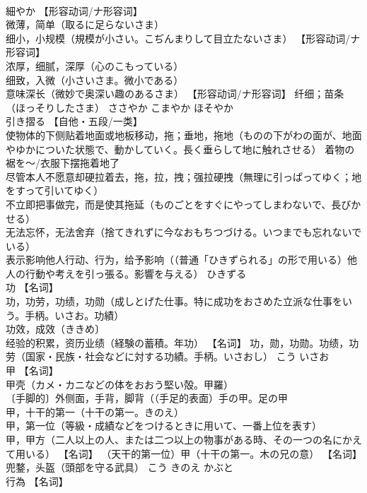 \documentclass[8pt]{extreport}
\begin{document}
\begin{CJK}{UTF8}{min}
\\	細やか	【形容动词/ナ形容词】 
\\	微薄，简单（取るに足らないさま） 
\\	细小，小规模（規模が小さい。こぢんまりして目立たないさま） 【形容动词/ナ形容词】 
\\	浓厚，细腻，深厚（心のこもっている） 
\\	细致，入微（小さいさま。微小である） 
\\	意味深长（微妙で奥深い趣のあるさま） 【形容动词/ナ形容词】 纤细；苗条（ほっそりしたさま）	ささやか こまやか ほそやか	
\\	引き摺る	【自他・五段/一类】 
\\	使物体的下侧贴着地面或地板移动，拖；垂地，拖地（ものの下がわの面が、地面やゆかについた状態で、動かしていく。長く垂らして地に触れさせる） 着物の裾を〜/衣服下摆拖着地了 
\\	尽管本人不愿意却硬拉着去，拖，拉，拽；强拉硬拽（無理に引っぱってゆく；地をすって引いてゆく） 
\\	不立即把事做完，而是使其拖延（ものごとをすぐにやってしまわないで、長びかせる） 
\\	无法忘怀，无法舍弃（捨てきれずに今なおもちつづける。いつまでも忘れないでいる） 
\\	表示影响他人行动、行为，给予影响（（普通「ひきずられる」の形で用いる）他人の行動や考えを引っ張る。影響を与える）	ひきずる	
\\	功	【名词】 
\\	功，功劳，功绩，功勋（成しとげた仕事。特に成功をおさめた立派な仕事をいう。手柄。いさお。功績） 
\\	功效，成效（ききめ〕 
\\	经验的积累，资历业绩（経験の蓄積。年功） 【名词】 功，勋，功勋。功绩，功劳（国家・民族・社会などに対する功績。手柄。いさおし）	こう いさお	
\\	甲	【名词】 
\\	甲壳（カメ・カニなどの体をおおう堅い殻。甲羅） 
\\	〔手脚的〕外侧面，手背，脚背（（手足的表面）手の甲。足の甲 
\\	甲，十干的第一（十干の第一。きのえ） 
\\	甲，第一位（等級・成績などをつけるときに用いて、一番上位を表す） 
\\	甲，甲方（二人以上の人、または二つ以上の物事がある時、その一つの名にかえて用いる） 【名词】 （天干的第一位）甲（十干の第一。木の兄の意） 【名词】 兜鍪，头盔（頭部を守る武具）	こう きのえ かぶと	
\\	行為	【名词】 

\end{CJK}
\end{document}
